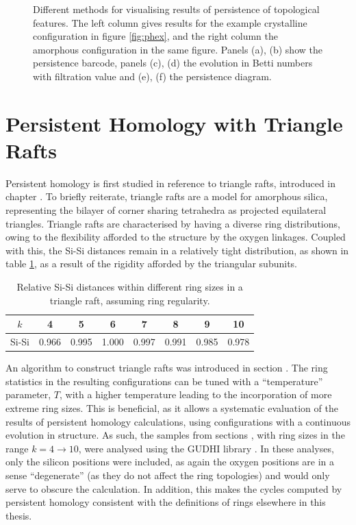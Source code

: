 \begin{figure}[tbp]
	\caption{Different methods for visualising results of persistence of topological features. The left column gives results for the example crystalline configuration in figure \ref{fig:phex}, and the right column the amorphous configuration in the same figure. Panels (a), (b) show the persistence barcode, panels (c), (d) the evolution in Betti numbers with filtration value and (e), (f) the persistence diagram.}
	\label{fig:exvis}
\end{figure}

\section{Persistent Homology with Triangle Rafts}

Persistent homology is first studied in reference to triangle rafts, introduced in chapter .
To briefly reiterate, triangle rafts are a model for \td{} amorphous silica, representing the bilayer of corner sharing tetrahedra as projected equilateral triangles.
Triangle rafts are characterised by having a diverse ring distributions, owing to the flexibility afforded to the structure by the oxygen linkages.
Coupled with this, the Si\--Si distances remain in a relatively tight distribution, as shown in table \ref{tab:trsidist}, as a result of the rigidity afforded by the triangular subunits.

\begin{table}[hbt]
\centering
\caption{Relative Si\--Si distances within different ring sizes in a triangle raft, assuming ring regularity.}
\label{tab:trsidist}
\begin{tabular}{cccccccc}
\toprule
$k$ & 4 & 5 & 6 & 7 & 8 & 9 & 10 \\
\midrule
Si\--Si & 0.966 & 0.995 & 1.000 & 0.997 & 0.991 & 0.985 & 0.978 \\
\bottomrule
\end{tabular}
\end{table}

An algorithm to construct triangle rafts was introduced in section .
The ring statistics in the resulting configurations can be tuned with a ``temperature'' parameter, $T$, with a higher temperature leading to the incorporation of more extreme ring sizes.
This is beneficial, as it allows a systematic evaluation of the results of persistent homology calculations, using configurations with a continuous evolution in structure.
As such, the samples from sections , with ring sizes in the range $k=4\rightarrow10$, were analysed using the GUDHI library \cite{gudhi}.
In these analyses, only the silicon positions were included, as again the oxygen positions are in a sense ``degenerate'' (as they do not affect the ring topologies) and would only serve to obscure the calculation.
In addition, this makes the cycles computed by persistent homology consistent with the definitions of rings elsewhere in this thesis.

